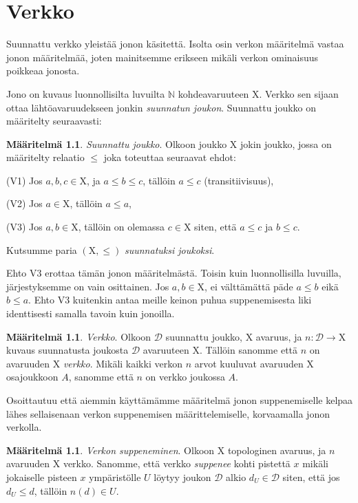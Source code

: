 \documentclass[12pt,a4paper,leqno]{report}
\newcommand{\N}{\mathbb{N}}
\newcommand{\X}{\mathrm{X}}
\newcommand{\D}{\mathcal{D}}
\newcommand{\verkop}{\leq}
\theoremstyle{plain}
\theoremstyle{definition}
\newtheorem{maar}[equation]{Määritelmä}
\theoremstyle{remark}
\begin{document}
\chapter{Verkko}

Suunnattu verkko yleistää jonon käsitettä. Isolta osin verkon määritelmä vastaa jonon määritelmää, joten mainitsemme erikseen mikäli verkon ominaisuus poikkeaa jonosta.

Jono on kuvaus luonnollisilta luvuilta $\N$ kohdeavaruuteen $\X$. Verkko sen sijaan ottaa lähtöavaruudekseen jonkin \emph{suunnatun joukon}. Suunnattu joukko on määritelty seuraavasti:

\begin{maar}\label{suunjoukmaar}
\emph{Suunnattu joukko}. Olkoon joukko $\X$ jokin joukko, jossa on määritelty relaatio $\verkop$ joka toteuttaa seuraavat ehdot:

(V1) Jos $a, b, c \in \X$, ja $a \verkop b \verkop c$, tällöin $a \verkop c$ (transitiivisuus),

(V2) Jos $a \in \X$, tällöin $a \verkop a$,

(V3) Jos $a, b \in \X$, tällöin on olemassa $c \in \X$ siten, että $a \verkop c$ ja $b \verkop c$.

Kutsumme paria $(\X, \verkop)$ \emph{suunnatuksi joukoksi}.
\end{maar}

Ehto V3 erottaa tämän jonon määritelmästä. Toisin kuin luonnollisilla luvuilla, järjestyksemme on vain osittainen. Jos $a, b \in \X$, ei välttämättä päde $a \verkop b$ eikä $b \verkop a$. Ehto V3 kuitenkin antaa meille keinon puhua suppenemisesta liki identtisesti samalla tavoin kuin jonoilla.

\begin{maar}\label{verkmaar}
\emph{Verkko}. Olkoon $\D$ suunnattu joukko, $\X$ avaruus, ja $n : \D \to \X$ kuvaus suunnatusta joukosta $\D$ avaruuteen $\X$. Tällöin sanomme että $n$ on avaruuden $\X$ \emph{verkko}. Mikäli kaikki verkon $n$ arvot kuuluvat avaruuden $\X$ osajoukkoon $A$, sanomme että $n$ on verkko joukossa $A$.
\end{maar}

Osoittautuu että aiemmin käyttämämme määritelmä jonon suppenemiselle kelpaa lähes sellaisenaan verkon suppenemisen määrittelemiselle, korvaamalla jonon verkolla.

\begin{maar}\label{verksupmaar}
\emph{Verkon suppeneminen}. Olkoon $\X$ topologinen avaruus, ja $n$ avaruuden $\X$ verkko. Sanomme, että verkko \emph{suppenee} kohti pistettä $x$ mikäli jokaiselle pisteen $x$ ympäristölle $U$ löytyy joukon $\D$ alkio $d_U \in \D$ siten, että jos $d_U \verkop d$, tällöin $n(d) \in U$.
\end{maar}
\end{document}
